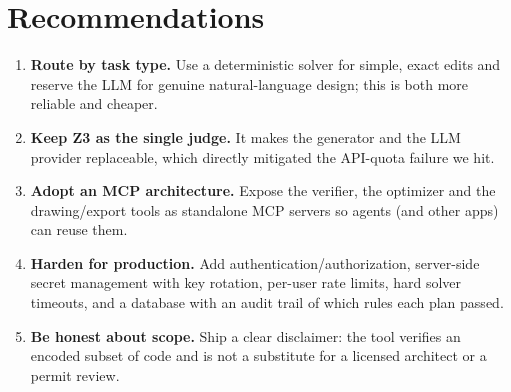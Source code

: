 \documentclass{book}
\begin{document}
\chapter{Recommendations}
\begin{enumerate}
\item \textbf{Route by task type.} Use a deterministic solver for simple, exact edits and reserve the LLM for genuine natural-language design; this is both more reliable and cheaper.
\item \textbf{Keep Z3 as the single judge.} It makes the generator and the LLM provider replaceable, which directly mitigated the API-quota failure we hit.
\item \textbf{Adopt an MCP architecture.} Expose the verifier, the optimizer and the drawing/export tools as standalone MCP servers so agents (and other apps) can reuse them.
\item \textbf{Harden for production.} Add authentication/authorization, server-side secret management with key rotation, per-user rate limits, hard solver timeouts, and a database with an audit trail of which rules each plan passed.
\item \textbf{Be honest about scope.} Ship a clear disclaimer: the tool verifies an encoded subset of code and is not a substitute for a licensed architect or a permit review.
\end{enumerate}


\end{document}
